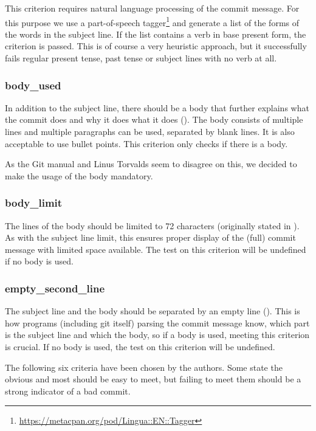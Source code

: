 This criterion requires natural language processing of the commit message. For this purpose we use a part-of-speech tagger\footnote{\url{https://metacpan.org/pod/Lingua::EN::Tagger}} and generate a list of the forms of the words in the subject line. If the list contains a verb in base present form, the criterion is passed. This is of course a very heuristic approach, but it successfully fails regular present tense, past tense or subject lines with no verb at all.

\subsubsection{body\_used}
\label{subs:body_used}
In addition to the subject line, there should be a body that further explains what the commit does and why it does what it does (\cite{OffGuide}). The body consists of multiple lines and multiple paragraphs can be used, separated by blank lines. It is also acceptable to use bullet points. This criterion only checks if there is a body.

As the Git manual \cite{OffGuide} and Linus Torvalds \cite{SR} seem to disagree on this, we decided to make the usage of the body mandatory.

\subsubsection{body\_limit}
\label{subs:body_limit}
The lines of the body should be limited to 72 characters (originally stated in \cite{TP}). As with the subject line limit, this ensures proper display of the (full) commit message with limited space available. The test on this criterion will be undefined if no body is used.

\subsubsection{empty\_second\_line}
\label{subs:empty_second_line}
The subject line and the body should be separated by an empty line (\cite{TP}). This is how programs (including git itself) parsing the commit message know, which part is the subject line and which the body, so if a body is used, meeting this criterion is crucial. If no body is used, the test on this criterion will be undefined.

\par\bigskip
The following six criteria have been chosen by the authors. Some state the obvious and most should be easy to meet, but failing to meet them should be a strong indicator of a bad commit.

